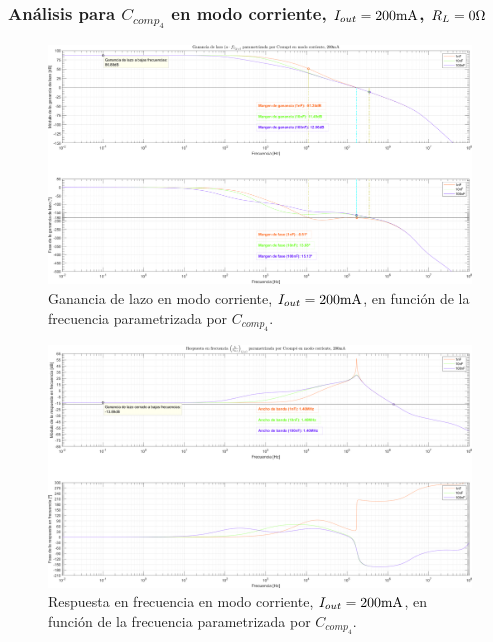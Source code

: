\subsubsection{Análisis para $C_{comp_{4}}$ en modo corriente, $I_{out} = 200 \si[per-mode=symbol]{\milli\ampere}$, $R_{L} = 0 \si[per-mode=symbol]{\ohm}$}

\clearpage

\begin{figure}[H] %
\begin{center}
\includegraphics[width=1.1 \textwidth, angle=90]{./img/plots/loop/power_supply_CCOMP4_LOOP_Modo4.png}
\caption{\label{fig:fig_power_supply_CCOMP4_LOOP_Modo4}\footnotesize{Ganancia de lazo en modo corriente, $I_{out} = 200 \si[per-mode=symbol]{\milli\ampere}$, en función de la frecuencia parametrizada por $C_{comp_{4}}$.}}
\end{center}
\end{figure}


\clearpage

\begin{figure}[H] %
\begin{center}
\includegraphics[width=1.1 \textwidth, angle=90]{./img/plots/rf/power_supply_CCOMP4_RF_Modo4.png}
\caption{\label{fig:fig_power_supply_CCOMP4_RF_Modo4}\footnotesize{Respuesta en frecuencia en modo corriente, $I_{out} = 200 \si[per-mode=symbol]{\milli\ampere}$, en función de la frecuencia parametrizada por $C_{comp_{4}}$.}}
\end{center}
\end{figure}

